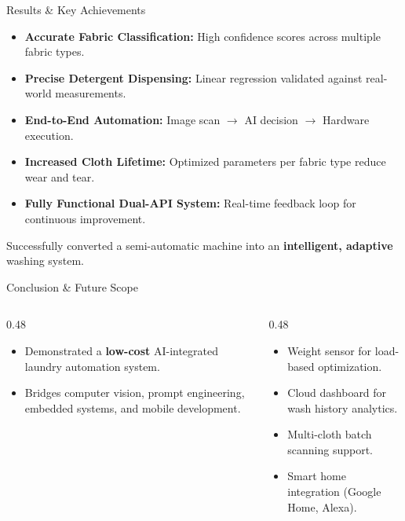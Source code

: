 \documentclass[aspectratio=169]{beamer}
\begin{document}
\begin{frame}{Results \& Key Achievements}
\begin{itemize}
  \item \textbf{Accurate Fabric Classification:}
    High confidence scores across multiple fabric types.
  \item \textbf{Precise Detergent Dispensing:}
    Linear regression validated against real-world measurements.
  \item \textbf{End-to-End Automation:}
    Image scan $\rightarrow$ AI decision $\rightarrow$ Hardware execution.
  \item \textbf{Increased Cloth Lifetime:}
    Optimized parameters per fabric type reduce wear and tear.
  \item \textbf{Fully Functional Dual-API System:}
    Real-time feedback loop for continuous improvement.
\end{itemize}
\vspace{0.28cm}
\begin{tcolorbox}[successbox, title={\faTrophy\enspace Success}]
\centering
Successfully converted a semi-automatic machine into an
\textbf{intelligent, adaptive} washing system.
\end{tcolorbox}
\end{frame}

\begin{frame}{Conclusion \& Future Scope}
\begin{columns}[T]
\begin{column}{0.48\textwidth}
\begin{tcolorbox}[mycard, title={\faFlagCheckered\enspace Conclusion}]
\small
\begin{itemize}
  \item Demonstrated a \textbf{low-cost} AI-integrated laundry automation system.
  \item Bridges computer vision, prompt engineering, embedded systems, and mobile development.
\end{itemize}
\end{tcolorbox}
\end{column}
\begin{column}{0.48\textwidth}
\begin{tcolorbox}[accentcard, title={\faRocket\enspace Future Scope}]
\small
\begin{itemize}
  \item Weight sensor for load-based optimization.
  \item Cloud dashboard for wash history analytics.
  \item Multi-cloth batch scanning support.
  \item Smart home integration (Google Home, Alexa).
\end{itemize}
\end{tcolorbox}
\end{column}
\end{columns}
\end{frame}
\end{document}
